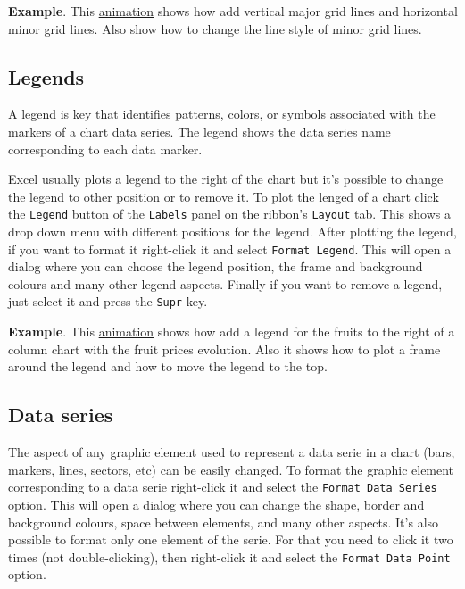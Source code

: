 \textbf{Example}. This \href{http://aprendeconalf.es/office/excel/manual/img/example_chart_grid.gif}{animation} shows how add vertical major grid lines and horizontal minor grid lines. Also show how to change the line style of minor grid lines.

\subsection{Legends}\hypertarget{legends}{}\label{legends}

A legend is key that identifies patterns, colors, or symbols associated with the markers of a chart data series. The legend shows the data series name corresponding to each data marker.

Excel usually plots a legend to the right of the chart but it's possible to change the legend to other position or to remove it. To plot the lenged of a chart click the \texttt{Legend} button of the \texttt{Labels} panel on the ribbon's \texttt{Layout} tab. This shows a drop down menu with different positions for the legend. After plotting the legend, if you want to format it right-click it and select \texttt{Format Legend}. This will open a dialog where you can choose the legend position, the frame and background colours and many other legend aspects. Finally if you want to remove a legend, just select it and press the \texttt{Supr} key.

\textbf{Example}. This \href{http://aprendeconalf.es/office/excel/manual/img/example_chart_legend.gif}{animation} shows how add a legend for the fruits to the right of a column chart with the fruit prices evolution. Also it shows how to plot a frame around the legend and how to move the legend to the top.

\subsection{Data series}\hypertarget{data-series}{}\label{data-series}

The aspect of any graphic element used to represent a data serie in a chart (bars, markers, lines, sectors, etc) can be easily changed. To format the graphic element corresponding to a data serie right-click it and select the \texttt{Format Data Series} option. This will open a dialog where you can change the shape, border and background colours, space between elements, and many other aspects. It's also possible to format only one element of the serie. For that you need to click it two times (not double-clicking), then right-click it and select the \texttt{Format Data Point} option.

